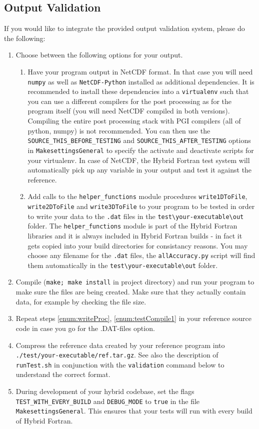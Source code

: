 \subsection{Output Validation} \label{sub:testIntegration}
If you would like to integrate the provided output validation system, please do the following:
\begin{enumerate}
  \item \label{enum:writeProc} Choose between the following options for your output.
    \begin{enumerate}
      \item Have your program output in NetCDF format. In that case you will need \verb|numpy| as well as \verb|NetCDF-Python| installed as additional dependencies. It is recommended to install these dependencies into a \verb|virtualenv| such that you can use a different compilers for the post processing as for the program itself (you will need NetCDF compiled in both versions). Compiling the entire post processing stack with PGI compilers (all of python, numpy) is not recommended. You can then use the \verb|SOURCE_THIS_BEFORE_TESTING| and \verb|SOURCE_THIS_AFTER_TESTING| options in \verb|MakesettingsGeneral| to specify the activate and deactivate scripts for your virtualenv. In case of NetCDF, the Hybrid Fortran test system will automatically pick up any variable in your output and test it against the reference.
      \item Add calls to the \verb|helper_functions| module procedures \verb|write1DToFile|, \verb|write2DToFile| and \verb|write3DToFile| to your program to be tested in order to write your data to the \verb|.dat| files in the \verb|test\your-executable\out| folder. The \verb|helper_functions| module is part of the Hybrid Fortran libraries and it is always included in Hybrid Fortran builds - in fact it gets copied into your build directories for consistancy reasons. You may choose any filename for the \verb|.dat| files, the \verb|allAccuracy.py| script will find them automatically in the \verb|test\your-executable\out| folder.
    \end{enumerate}
  \item \label{enum:testCompile1} Compile (\verb|make; make install| in project directory) and run your program to make sure the files are being created. Make sure that they actually contain data, for example by checking the file size.
  \item Repeat steps \ref{enum:writeProc}, \ref{enum:testCompile1} in your reference source code in case you go for the .DAT-files option.
  \item Compress the reference data created by your reference program into \linebreak\verb|./test/your-executable/ref.tar.gz|. See also the description of \verb|runTest.sh| in conjunction with the \verb|validation| command below to understand the correct format.
  \item During development of your hybrid codebase, set the flags \verb|TEST_WITH_EVERY_BUILD| and \verb|DEBUG_MODE| to \verb|true| in the file \verb|MakesettingsGeneral|. This ensures that your tests will run with every build of Hybrid Fortran.
\end{enumerate}

